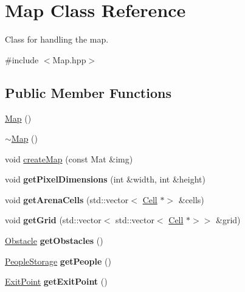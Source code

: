 \hypertarget{class_map}{}\section{Map Class Reference}
\label{class_map}


Class for handling the map.  




{\ttfamily \#include $<$Map.\+hpp$>$}

\subsection*{Public Member Functions}
\begin{DoxyCompactItemize}
\item 
\mbox{\hyperlink{class_map_a0f5ad0fd4563497b4214038cbca8b582}{Map}} ()
\item 
\mbox{\hyperlink{class_map_aa403fbe09394ccf39747588f5168e3b2}{$\sim$\+Map}} ()
\item 
void \mbox{\hyperlink{class_map_a02537656e91e97077dfdfc5d84c3027b}{create\+Map}} (const Mat \&img)
\item 
\mbox{\label{class_map_aaba4246a4400e03db7218828402994df}} 
void {\bfseries get\+Pixel\+Dimensions} (int \&width, int \&height)
\item 
\mbox{\label{class_map_a8eb8b7841ba4ccf02646fe2c288c7fc5}} 
void {\bfseries get\+Arena\+Cells} (std\+::vector$<$ \mbox{\hyperlink{class_cell}{Cell}} $\ast$$>$ \&cells)
\item 
\mbox{\label{class_map_a0bc04be78a3badfaa364bc3f48fbfdfe}} 
void {\bfseries get\+Grid} (std\+::vector$<$ std\+::vector$<$ \mbox{\hyperlink{class_cell}{Cell}} $\ast$$>$$>$ \&grid)
\item 
\mbox{\label{class_map_a17022b64f602dfd4d45a84c0ffa92270}} 
\mbox{\hyperlink{class_obstacle}{Obstacle}} {\bfseries get\+Obstacles} ()
\item 
\mbox{\label{class_map_a26df03922b64a9676a0a457e8d6a69af}} 
\mbox{\hyperlink{struct_people_storage}{People\+Storage}} {\bfseries get\+People} ()
\item 
\mbox{\label{class_map_ab3a1357229f508284bc9d8e3b25b6c1b}} 
\mbox{\hyperlink{class_exit_point}{Exit\+Point}} {\bfseries get\+Exit\+Point} ()
$$
\end{DoxyCompactItemize}
